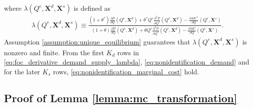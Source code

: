 \documentclass[11pt, a4paper]{article}
\begin{document}
where $\lambda(Q^e, \bm{X}^{d}, \bm{X}^{s})$ is defined as
\begin{align}
    \lambda(Q^e, \bm{X}^{d}, \bm{X}^{s}) \equiv \frac{(1+\theta^{*})\frac{\partial P}{\partial Q}(Q^e, \bm{X}^{d}) + \theta^{*} Q^e\frac{\partial^2 P}{\partial Q^2}(Q^e, \bm{X}^{d}) - \frac{\partial MC^{*}}{\partial Q}(Q^e, \bm{X}^{s})}{(1+\theta)\frac{\partial P}{\partial Q}(Q^e, \bm{X}^{d}) + \theta Q^e\frac{\partial^2 P}{\partial Q^2}(Q^e, \bm{X}^{d}) - \frac{\partial MC}{\partial Q}(Q^e, \bm{X}^{s})}.
\end{align}
Assumption \ref{assumption:unique_equilibrium} guarantees that $\lambda(Q^e, \bm{X}^{d}, \bm{X}^{s})$ is nonzero and finite.
From the first $K_d$ rows in \eqref{eq:foc_derivative_demand_supply_lambda}, \eqref{eq:nonidentification_demand} and for the later $K_s$ rows, \eqref{eq:nonidentification_marginal_cost} hold.


\subsection{Proof of Lemma \ref{lemma:mc_transformation}}
\end{document}
